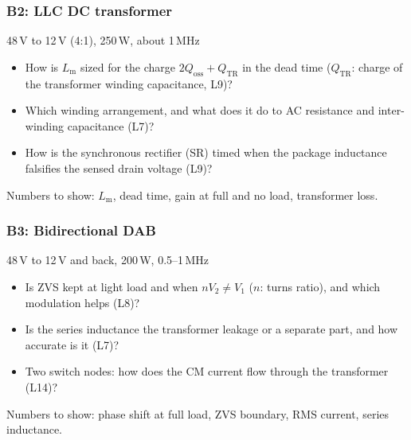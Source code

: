 \begin{frame}
	\frametitle{B2: LLC DC transformer}
	\begin{varblock}[\textwidth]{48\,V to 12\,V (4:1), 250\,W, about 1\,MHz}
		\begin{itemize}
			\item How is $L_\mathrm{m}$ sized for the charge $2Q_\mathrm{oss}+Q_\mathrm{TR}$ in the dead time ($Q_\mathrm{TR}$: charge of the transformer winding capacitance, L9)?
			\item Which winding arrangement, and what does it do to AC resistance and inter-winding capacitance (L7)?
			\item How is the synchronous rectifier (SR) timed when the package inductance falsifies the sensed drain voltage (L9)?
		\end{itemize}
	\end{varblock}
	\small
	Numbers to show: $L_\mathrm{m}$, dead time, gain at full and no load, transformer loss.
\end{frame}

\begin{frame}
	\frametitle{B3: Bidirectional DAB}
	\begin{varblock}[\textwidth]{48\,V to 12\,V and back, 200\,W, 0.5--1\,MHz}
		\begin{itemize}
			\item Is ZVS kept at light load and when $nV_2\neq V_1$ ($n$: turns ratio), and which modulation helps (L8)?
			\item Is the series inductance the transformer leakage or a separate part, and how accurate is it (L7)?
			\item Two switch nodes: how does the CM current flow through the transformer (L14)?
		\end{itemize}
	\end{varblock}
	\small
	Numbers to show: phase shift at full load, ZVS boundary, RMS current, series inductance.
\end{frame}

